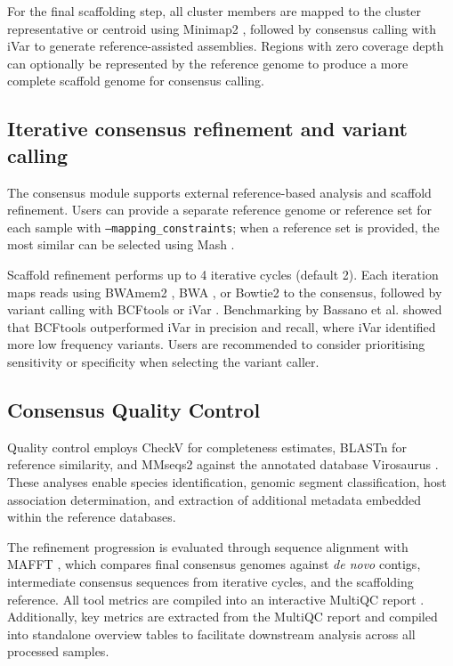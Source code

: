 For the final scaffolding step, all cluster members are mapped to the cluster representative or centroid using Minimap2 \citep{Li2018-gi}, followed by consensus calling with iVar \citep{Grubaugh2019-xd} to generate reference-assisted assemblies. Regions with zero coverage depth can optionally be represented by the reference genome to produce a more complete scaffold genome for consensus calling.

\subsection{Iterative consensus refinement and variant calling}

The consensus module supports external reference-based analysis and scaffold refinement. Users can provide a separate reference genome or reference set for each sample with \texttt{--mapping\_constraints}; when a reference set is provided, the most similar can be selected using Mash \citep{Ondov2019-bo}.

Scaffold refinement performs up to 4 iterative cycles (default 2). Each iteration maps reads using BWAmem2 \citep{Vasimuddin2019-rb}, BWA \citep{Li2013-pp}, or Bowtie2 \citep{Langmead2019-wx} to the consensus, followed by variant calling with BCFtools \citep{Danecek2021-je} or iVar \citep{Grubaugh2019-xd}. Benchmarking by Bassano et al. \citep{Bassano2022-cl} showed that BCFtools outperformed iVar in precision and recall, where iVar identified more low frequency variants. Users are recommended to consider prioritising sensitivity or specificity when selecting the variant caller.

\subsection{Consensus Quality Control}

Quality control employs CheckV \citep{Nayfach2021-wl} for completeness estimates, BLASTn \citep{Altschul1990-sy} for reference similarity, and MMseqs2 \citep{Steinegger2017-ci} against the annotated database Virosaurus \citep{Gleizes2020-rq}. These analyses enable species identification, genomic segment classification, host association determination, and extraction of additional metadata embedded within the reference databases.

The refinement progression is evaluated through sequence alignment with MAFFT \citep{Katoh2002-ox}, which compares final consensus genomes against \textit{de novo} contigs, intermediate consensus sequences from iterative cycles, and the scaffolding reference. All tool metrics are compiled into an interactive MultiQC report \citep{Ewels2016-hs}. Additionally, key metrics are extracted from the MultiQC report and compiled into standalone overview tables to facilitate downstream analysis across all processed samples.

